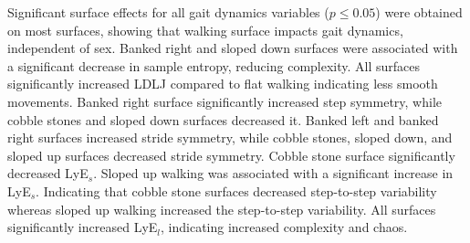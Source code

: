 \documentclass[authoryear,preprint,review,12pt]{elsarticle}
\begin{document}
Significant surface effects for all gait dynamics variables ($p \leq 0.05$) were obtained on most surfaces, showing that walking surface impacts gait dynamics, independent of sex.
Banked right and sloped down surfaces were associated with a significant decrease in sample entropy, reducing complexity. All surfaces significantly increased LDLJ compared to flat walking indicating less smooth movements. Banked right surface significantly increased step symmetry, while cobble stones and sloped down surfaces decreased it. Banked left and banked right surfaces increased stride symmetry, while cobble stones, sloped down, and sloped up surfaces decreased stride symmetry. Cobble stone surface significantly decreased LyE$_{s}$. Sloped up walking was associated with a significant increase in LyE$_{s}$. Indicating that cobble stone surfaces decreased step-to-step variability whereas sloped up walking increased the step-to-step variability. All surfaces significantly increased LyE${_l}$, indicating increased complexity and chaos.


\end{document}
